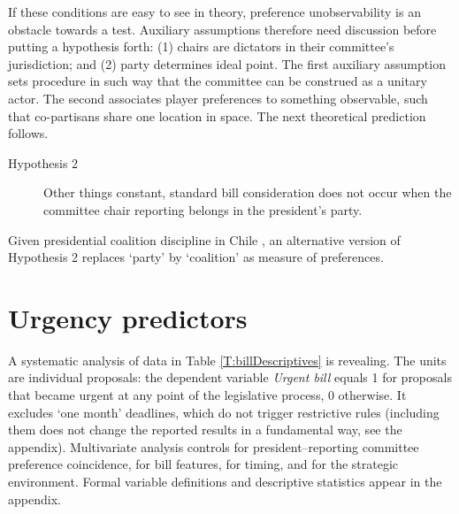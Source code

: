 \documentclass[letter,12pt]{article}
\newcommand{\emm}[1]{\todo[color=red!15, inline]{\textbf{EM:} #1}}
\begin{document}
If these conditions are easy to see in theory, preference unobservability is an obstacle towards a test. Auxiliary assumptions therefore need discussion before putting a hypothesis forth: (1) chairs are dictators in their committee's jurisdiction; and (2) party determines ideal point. The first auxiliary assumption sets procedure in such way that the committee can be construed as a unitary actor. The second associates player preferences to something observable, such that co-partisans share one location in space. The next theoretical prediction follows. 

\begin{description}
  \item [Hypothesis 2] Other things constant, standard bill consideration does not occur when the committee chair reporting belongs in the president's party. 
\end{description}

\noindent Given presidential coalition discipline in Chile \citep{aleman.saiegh.coalUnityChile.2007,carey.2002}, an alternative version of Hypothesis 2 replaces `party' by `coalition' as measure of preferences. 


\section{Urgency predictors}

A systematic analysis of data in Table \ref{T:billDescriptives} is revealing. The units are individual proposals: the dependent variable \emph{Urgent bill} equals 1 for proposals that became urgent at any point of the legislative process, 0 otherwise. It excludes `one month' deadlines, which do not trigger restrictive rules (including them does not change the reported results in a fundamental way, see the appendix). Multivariate analysis controls for president--reporting committee preference coincidence, for bill features, for timing, and for the strategic environment. Formal variable definitions and descriptive statistics appear in the appendix.
\end{document}
